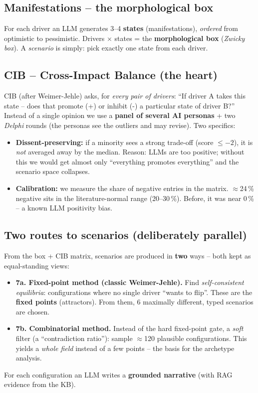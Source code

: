 \documentclass[11pt,a4paper]{article}
\begin{document}
\subsection{Manifestations -- the morphological box}
For each driver an LLM generates 3--4 \textbf{states} (manifestations), \emph{ordered} from optimistic to
pessimistic. Drivers $\times$ states = the \textbf{morphological box} (\emph{Zwicky box}). A \emph{scenario}
is simply: pick exactly one state from each driver.

\subsection{CIB -- Cross-Impact Balance (the heart)}
CIB (after Weimer-Jehle) asks, for \emph{every pair of drivers}: \enquote{If driver A takes this state --
does that promote (+) or inhibit (-) a particular state of driver B?} Instead of a single opinion we use
a \textbf{panel of several AI personas} + two \emph{Delphi} rounds (the personas see the outliers and may
revise). Two specifics:
\begin{itemize}
  \item \textbf{Dissent-preserving:} if a minority sees a strong trade-off (score $\le -2$), it is
  \emph{not} averaged away by the median. Reason: LLMs are too positive; without this we would get almost
  only \enquote{everything promotes everything} and the scenario space collapses.
  \item \textbf{Calibration:} we measure the share of negative entries in the matrix. $\approx$24\,\%
  negative sits in the literature-normal range (20--30\,\%). Before, it was near 0\,\% -- a known LLM
  positivity bias.
\end{itemize}

\subsection{Two routes to scenarios (deliberately parallel)}
From the box + CIB matrix, scenarios are produced in \textbf{two} ways -- both kept as equal-standing
views:
\begin{itemize}
  \item \textbf{7a. Fixed-point method (classic Weimer-Jehle).} Find \emph{self-consistent equilibria}:
  configurations where no single driver \enquote{wants to flip}. These are the \textbf{fixed points}
  (attractors). From them, 6 maximally different, typed scenarios are chosen.
  \item \textbf{7b. Combinatorial method.} Instead of the hard fixed-point gate, a \emph{soft} filter (a
  \enquote{contradiction ratio}): sample $\approx$120 plausible configurations. This yields a \emph{whole
  field} instead of a few points -- the basis for the archetype analysis.
\end{itemize}
For each configuration an LLM writes a \textbf{grounded narrative} (with RAG evidence from the KB).
\end{document}
